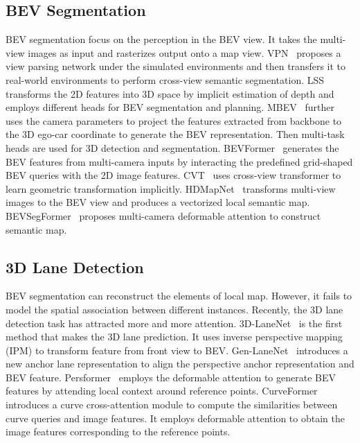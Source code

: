 \documentclass[10pt,twocolumn,letterpaper]{article}
\begin{document}
\subsection{BEV Segmentation}
BEV segmentation focus on the perception in the BEV view. It takes the multi-view images as input and rasterizes output onto a map view.
VPN~\cite{pan2020cross} proposes a view parsing network under the simulated environments and then transfers it to real-world environments to perform cross-view semantic segmentation.
LSS~\cite{philion2020lift} transforms the 2D features into 3D space by implicit estimation of depth and employs different heads for BEV segmentation and planning. 
MBEV~\cite{xie2022m} further uses the camera parameters to project the features extracted from backbone to the 3D ego-car coordinate to generate the BEV representation. Then multi-task heads are used for 3D detection and segmentation.
BEVFormer~\cite{li2022bevformer} generates the BEV features from multi-camera inputs by interacting the predefined grid-shaped BEV queries with the 2D image features.
CVT~\cite{zhou2022cross} uses cross-view transformer to learn geometric transformation implicitly.
HDMapNet~\cite{li2021hdmapnet} transforms multi-view images to the BEV view and produces a vectorized local semantic map.  
BEVSegFormer~\cite{peng2022bevsegformer} proposes multi-camera
deformable attention to construct semantic map. 

\subsection{3D Lane Detection}
BEV segmentation can reconstruct the elements of local map. However, it fails to model the spatial association between different instances. Recently, the 3D lane detection task has attracted more and more attention. 3D-LaneNet~\cite{garnett20193d} is the first method that makes the 3D lane prediction. It uses inverse perspective mapping (IPM) to transform feature from front view to BEV. Gen-LaneNet~\cite{guo2020gen} introduces a new anchor lane representation to align the perspective anchor representation and BEV feature. Persformer~\cite{chen2022persformer} employs the deformable attention to generate BEV features by attending local context around reference points.    
CurveFormer~\cite{bai2022curveformer} introduces a curve cross-attention module to compute the similarities between curve queries and image features. It employs deformable attention to obtain the image features corresponding to the reference points.
\end{document}
